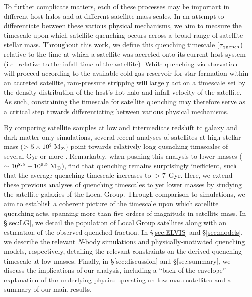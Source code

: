 To further complicate matters, each of these processes may be
important in different host halos and at different satellite mass
scales.
%
In an attempt to differentiate between these various physical
mechanisms, we aim to measure the timescale upon which satellite
quenching occurs across a broad range of satellite stellar
mass. Throughout this work, we define this quenching timescale
($\tau_{\rm quench}$) relative to the time at which a satellite was
accreted onto its current host system (i.e.~relative to the infall
time of the satellite). While quenching via starvation will proceed
according to the available cold gas reservoir for star formation
within an accreted satellite, ram-pressure stripping will largely act
on a timescale set by the density distribution of the host's hot halo
and infall velocity of the satellite. As such, constraining the
timescale for satellite quenching may therefore serve as a critical
step towards differentiating between various physical mechanisms.


By comparing satellite samples at low and intermediate redshift to
galaxy and dark matter-only simulations, several recent analyses of
satellites at high stellar mass ($> 5 \times 10^{9}~{\rm M}_{\odot}$) point
towards relatively long quenching timescales of several Gyr or more
\citep{wetzel13, delucia12}. 
%
Remarkably, when pushing this analysis to lower masses ($\sim 10^{8.5}
- 10^{9.5}~{\rm M}_{\odot}$), \citet{wheeler14} find that quenching remains
surprisingly inefficient, such that the average quenching timescale
increases to $> 7$~Gyr. Here, we extend these previous analyses of
quenching timescales to yet lower masses by studying the satellite
galaxies of the Local Group. Through comparison to simulations, we aim
to establish a coherent picture of the timescale upon which satellite
quenching acts, spanning more than five orders of magnitude in
satellite mass. In \S\ref{sec:LG}, we detail the population of Local
Group satellites along with an estimation of the observed quenched
fraction. In \S\ref{sec:ELVIS} and \S\ref{sec:models}, we describe the
relevant $N$-body simulations and physically-motivated quenching
models, respectively, detailing the relevant constraints on the
derived quenching timescale at low masses. Finally, in
\S\ref{sec:discussion} and \S\ref{sec:summary}, we discuss the
implications of our analysis, including a ``back of the envelope''
explanation of the underlying physics operating on low-mass satellites
and a summary of our main results.


